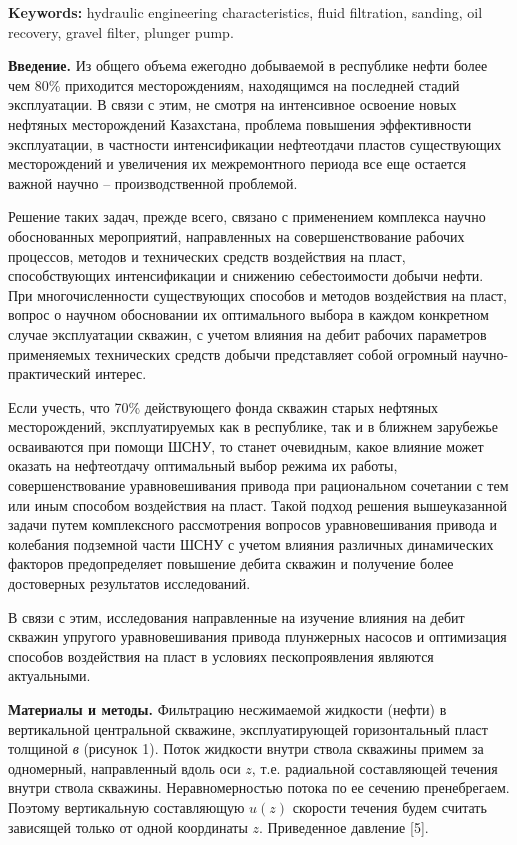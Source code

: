 {\bfseries Keywords:} hydraulic engineering characteristics, fluid
filtration, sanding, oil recovery, gravel filter, plunger pump.

\begin{multicols}{2}
{\bfseries Введение.} Из общего объема ежегодно добываемой в республике
нефти более чем 80\% приходится месторождениям, находящимся на последней
стадий эксплуатации. В связи с этим, не смотря на интенсивное освоение
новых нефтяных месторождений Казахстана, проблема повышения
эффективности эксплуатации, в частности интенсификации нефтеотдачи
пластов существующих месторождений и увеличения их межремонтного периода
все еще остается важной научно -- производственной проблемой.

Решение таких задач, прежде всего, связано с применением комплекса
научно обоснованных мероприятий, направленных на совершенствование
рабочих процессов, методов и технических средств воздействия на пласт,
способствующих интенсификации и снижению себестоимости добычи нефти. При
многочисленности существующих способов и методов воздействия на пласт,
вопрос о научном обосновании их оптимального выбора в каждом конкретном
случае эксплуатации скважин, с учетом влияния на дебит рабочих
параметров применяемых технических средств добычи представляет собой
огромный научно-практический интерес.

Если учесть, что 70\% действующего фонда скважин старых нефтяных
месторождений, эксплуатируемых как в республике, так и в ближнем
зарубежье осваиваются при помощи ШСНУ, то станет очевидным, какое
влияние может оказать на нефтеотдачу оптимальный выбор режима их работы,
совершенствование уравновешивания привода при рациональном сочетании с
тем или иным способом воздействия на пласт. Такой подход решения
вышеуказанной задачи путем комплексного рассмотрения вопросов
уравновешивания привода и колебания подземной части ШСНУ с учетом
влияния различных динамических факторов предопределяет повышение дебита
скважин и получение более достоверных результатов исследований.

В связи с этим, исследования направленные на изучение влияния на дебит
скважин упругого уравновешивания привода плунжерных насосов и
оптимизация способов воздействия на пласт в условиях пескопроявления
являются актуальными.

{\bfseries Материалы и методы.} Фильтрацию несжимаемой жидкости (нефти) в
вертикальной центральной скважине, эксплуатирующей горизонтальный пласт
толщиной \emph{в} (рисунок 1). Поток жидкости внутри ствола скважины
примем за одномерный, направленный вдоль оси $z$, т.е. радиальной
составляющей течения внутри ствола скважины. Неравномерностью потока по
ее сечению пренебрегаем. Поэтому вертикальную составляющую $u(z)$
скорости течения будем считать зависящей только от одной координаты
$z$. Приведенное давление {[}5{]}.


\end{multicols}
